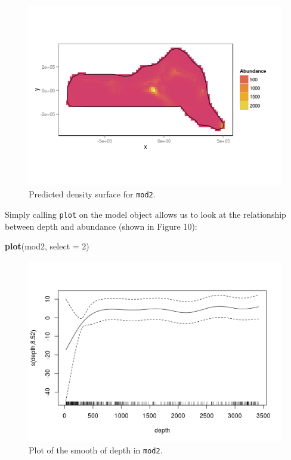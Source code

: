 \documentclass[]{article}
\newenvironment{Shaded}{}{}
\newcommand{\KeywordTok}[1]{\textcolor[rgb]{0.00,0.44,0.13}{\textbf{{#1}}}}
\newcommand{\DataTypeTok}[1]{\textcolor[rgb]{0.56,0.13,0.00}{{#1}}}
\newcommand{\DecValTok}[1]{\textcolor[rgb]{0.25,0.63,0.44}{{#1}}}
\newcommand{\NormalTok}[1]{{#1}}
\begin{document}
\begin{figure}[htbp]
\centering
\includegraphics{mexico-figs/mod2-preds.png}
\caption{Predicted density surface for \texttt{mod2}.}
\end{figure}

Simply calling \texttt{plot} on the model object allows us to look at
the relationship between depth and abundance (shown in Figure 10):

\begin{Shaded}
\begin{Highlighting}[]
\KeywordTok{plot}\NormalTok{(mod2, }\DataTypeTok{select =} \DecValTok{2}\NormalTok{)}
\end{Highlighting}
\end{Shaded}

\begin{figure}[htbp]
\centering
\includegraphics{mexico-figs/mod2-depth.png}
\caption{Plot of the smooth of depth in \texttt{mod2}.}
\end{figure}
\end{document}
